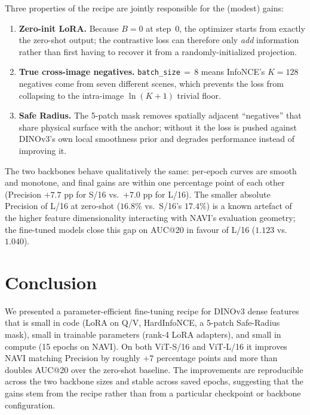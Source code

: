 \documentclass[11pt,a4paper]{article}
\begin{document}
Three properties of the recipe are jointly responsible for the (modest) gains:

\begin{enumerate}
    \item \textbf{Zero-init LoRA.} Because $B = 0$ at step~0, the optimizer starts from exactly the
    zero-shot output; the contrastive loss can therefore only \emph{add} information rather than first
    having to recover it from a randomly-initialized projection.
    \item \textbf{True cross-image negatives.} \texttt{batch\_size}\,$=$\,8 means InfoNCE's $K = 128$
    negatives come from seven different scenes, which prevents the loss from collapsing to the
    intra-image $\ln(K + 1)$ trivial floor.
    \item \textbf{Safe Radius.} The 5-patch mask removes spatially adjacent ``negatives'' that share
    physical surface with the anchor; without it the loss is pushed against DINOv3's own local
    smoothness prior and degrades performance instead of improving it.
\end{enumerate}

The two backbones behave qualitatively the same: per-epoch curves are smooth and monotone, and final
gains are within one percentage point of each other (Precision $+7.7$ pp for S/16 vs.\ $+7.0$ pp for
L/16). The smaller absolute Precision of L/16 at zero-shot ($16.8\%$ vs.\ S/16's $17.4\%$) is a known
artefact of the higher feature dimensionality interacting with NAVI's evaluation geometry; the
fine-tuned models close this gap on AUC@20 in favour of L/16 ($1.123$ vs.\ $1.040$).

\section{Conclusion}

We presented a parameter-efficient fine-tuning recipe for DINOv3 dense features that is small in code
(LoRA on Q/V, HardInfoNCE, a 5-patch Safe-Radius mask), small in trainable parameters (rank-4 LoRA
adapters), and small in compute (15 epochs on NAVI). On both ViT-S/16 and ViT-L/16 it improves NAVI
matching Precision by roughly $+7$ percentage points and more than doubles AUC@20 over the zero-shot
baseline. The improvements are reproducible across the two backbone sizes and stable across saved
epochs, suggesting that the gains stem from the recipe rather than from a particular checkpoint or
backbone configuration.
\end{document}

